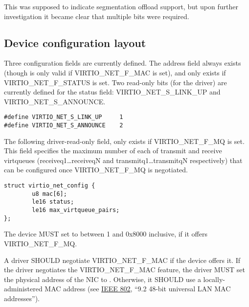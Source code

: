 This was supposed to indicate segmentation offload support, but
upon further investigation it became clear that multiple bits
were required.

\subsection{Device configuration layout}\label{sec:Device Types / Network Device / Device configuration layout}

Three configuration fields are currently defined. The  address field
always exists (though is only valid if VIRTIO_NET_F_MAC is set), and
 only exists if VIRTIO_NET_F_STATUS is set. Two
read-only bits (for the driver) are currently defined for the status field:
VIRTIO_NET_S_LINK_UP and VIRTIO_NET_S_ANNOUNCE.

\begin{lstlisting}
#define VIRTIO_NET_S_LINK_UP     1
#define VIRTIO_NET_S_ANNOUNCE    2
\end{lstlisting}

The following driver-read-only field,  only exists if
VIRTIO_NET_F_MQ is set. This field specifies the maximum number
of each of transmit and receive virtqueues (receiveq1\ldots receiveqN
and transmitq1\ldots transmitqN respectively) that can be configured once VIRTIO_NET_F_MQ
is negotiated.

\begin{lstlisting}
struct virtio_net_config {
        u8 mac[6];
        le16 status;
        le16 max_virtqueue_pairs;
};
\end{lstlisting}


The device MUST set  to between 1 and 0x8000 inclusive,
if it offers VIRTIO_NET_F_MQ.


A driver SHOULD negotiate VIRTIO_NET_F_MAC if the device offers it.
If the driver negotiates the VIRTIO_NET_F_MAC feature, the driver MUST set
the physical address of the NIC to .  Otherwise, it SHOULD
use a locally-administered MAC address (see \hyperref[intro:IEEE 802]{IEEE 802},
``9.2 48-bit universal LAN MAC addresses'').

